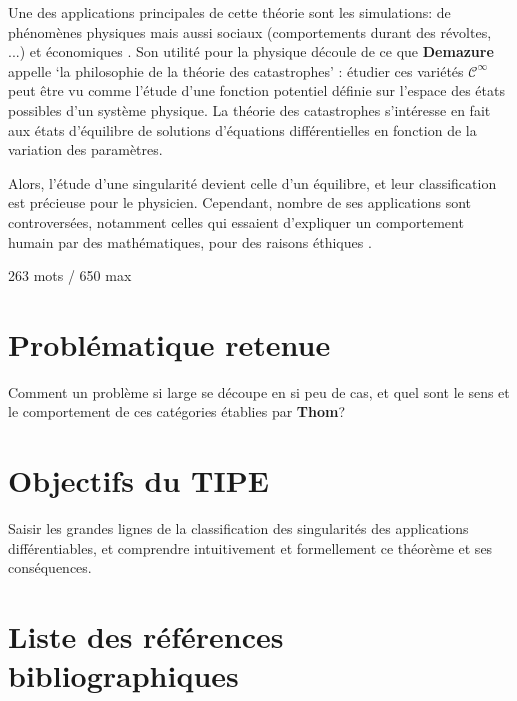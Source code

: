 \documentclass{article}
\begin{document}
Une des applications principales de cette théorie sont les simulations: de phénomènes physiques mais aussi sociaux (comportements durant des révoltes, ...) et économiques \cite{bbcvid} \cite{poston}.
Son utilité pour la physique découle de ce que \textbf{Demazure} appelle `la philosophie de la théorie des catastrophes' \cite{demazure}: étudier ces variétés $\mathcal{C}^\infty$ peut être vu comme l'étude d'une fonction potentiel définie sur l'espace des états possibles d'un système physique.
La théorie des catastrophes s'intéresse en fait aux états d'équilibre de solutions d'équations différentielles en fonction de la variation des paramètres.

Alors, l'étude d'une singularité devient celle d'un équilibre, et leur classification est précieuse pour le physicien.
Cependant, nombre de ses applications sont controversées, notamment celles qui essaient d'expliquer un comportement humain par des mathématiques, pour des raisons éthiques \cite{wikipedia}.

\bigskip

\small{263 mots / 650 max}

\section{Problématique retenue}

Comment un problème si large se découpe en si peu de cas, et quel sont le sens et le comportement de ces catégories établies par \textbf{Thom}?

\section{Objectifs du TIPE}

Saisir les grandes lignes de la classification des singularités des applications différentiables, et comprendre intuitivement et formellement ce théorème et ses conséquences.

\section{Liste des références bibliographiques}

\renewcommand\refname{\vskip -1cm}


\end{document}
